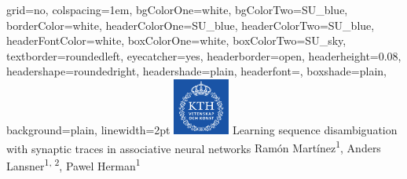 \documentclass[portrait,a4, final]{baposter}
\begin{document}

\newlength{\leftimgwidth}
\begin{poster}%
  {
  grid=no,
  colspacing=1em,
  bgColorOne=white,
  bgColorTwo=SU_blue,
  borderColor=white,
  headerColorOne=SU_blue,
  headerColorTwo=SU_blue,
  headerFontColor=white,
  boxColorOne=white, %
  boxColorTwo=SU_sky,
  textborder=roundedleft,
  eyecatcher=yes,
  headerborder=open,
  headerheight=0.08\textheight,
  headershape=roundedright,
  headershade=plain,
  headerfont=\Large\textsf, %
  boxshade=plain,
  background=plain,
  linewidth=2pt
  }
  {\includegraphics[height=5em]{Kth_logo2.png}} %
  {\sf %
  \color{black} Learning sequence disambiguation with synaptic traces in associative neural networks}
  {\sf %
  \vspace{0.5em}
  \color{SU_fire} Ram{\'o}n Mart{\'i}nez\textsuperscript{1},  Anders Lansner\textsuperscript{1, 2}, Pawel Herman\textsuperscript{1}\\ 
  \color{black}
  }
  {%
  }


\end{poster}
\end{document}
